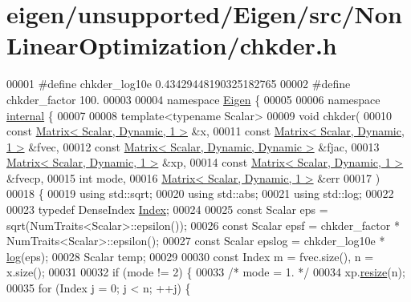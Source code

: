 \hypertarget{eigen_2unsupported_2_eigen_2src_2_non_linear_optimization_2chkder_8h_source}{}\section{eigen/unsupported/\+Eigen/src/\+Non\+Linear\+Optimization/chkder.h}
\label{eigen_2unsupported_2_eigen_2src_2_non_linear_optimization_2chkder_8h_source}

\begin{DoxyCode}
00001 \textcolor{preprocessor}{#define chkder\_log10e 0.43429448190325182765}
00002 \textcolor{preprocessor}{#define chkder\_factor 100.}
00003 
00004 \textcolor{keyword}{namespace }\hyperlink{namespace_eigen}{Eigen} \{ 
00005 
00006 \textcolor{keyword}{namespace }\hyperlink{namespaceinternal}{internal} \{
00007 
00008 \textcolor{keyword}{template}<\textcolor{keyword}{typename} Scalar>
00009 \textcolor{keywordtype}{void} chkder(
00010         \textcolor{keyword}{const} \hyperlink{group___core___module}{Matrix< Scalar, Dynamic, 1 >}  &x,
00011         \textcolor{keyword}{const} \hyperlink{group___core___module}{Matrix< Scalar, Dynamic, 1 >}  &fvec,
00012         \textcolor{keyword}{const} \hyperlink{group___core___module}{Matrix< Scalar, Dynamic, Dynamic >} &fjac,
00013         \hyperlink{group___core___module}{Matrix< Scalar, Dynamic, 1 >}  &xp,
00014         \textcolor{keyword}{const} \hyperlink{group___core___module}{Matrix< Scalar, Dynamic, 1 >}  &fvecp,
00015         \textcolor{keywordtype}{int} mode,
00016         \hyperlink{group___core___module}{Matrix< Scalar, Dynamic, 1 >}  &err
00017         )
00018 \{
00019     \textcolor{keyword}{using} std::sqrt;
00020     \textcolor{keyword}{using} std::abs;
00021     \textcolor{keyword}{using} std::log;
00022     
00023     \textcolor{keyword}{typedef} DenseIndex \hyperlink{namespace_eigen_a62e77e0933482dafde8fe197d9a2cfde}{Index};
00024 
00025     \textcolor{keyword}{const} Scalar eps = sqrt(NumTraits<Scalar>::epsilon());
00026     \textcolor{keyword}{const} Scalar epsf = chkder\_factor * NumTraits<Scalar>::epsilon();
00027     \textcolor{keyword}{const} Scalar epslog = chkder\_log10e * \hyperlink{structlog}{log}(eps);
00028     Scalar temp;
00029 
00030     \textcolor{keyword}{const} Index m = fvec.size(), n = x.size();
00031 
00032     \textcolor{keywordflow}{if} (mode != 2) \{
00033         \textcolor{comment}{/* mode = 1. */}
00034         xp.\hyperlink{class_eigen_1_1_plain_object_base_a99d9054ee2d5a40c6e00ded0265e9cea}{resize}(n);
00035         \textcolor{keywordflow}{for} (Index j = 0; j < n; ++j) \{

\end{DoxyCode}
